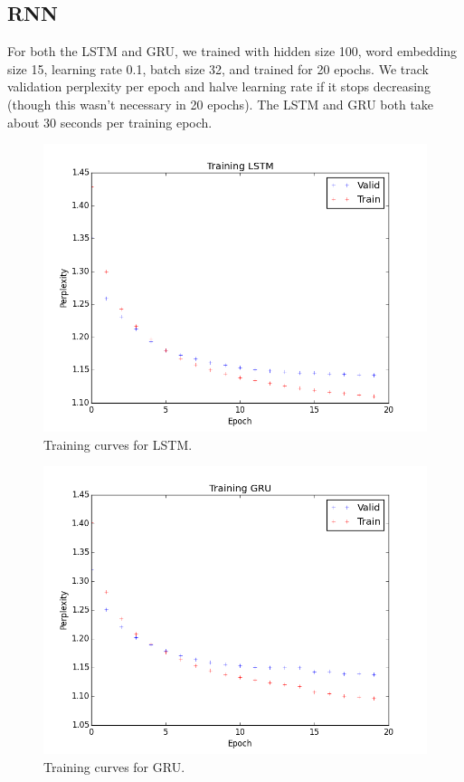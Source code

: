 \documentclass[11pt]{article}
\begin{document}
\subsection{RNN}

For both the LSTM and GRU, we trained with hidden size 100, word embedding size 15, learning rate 0.1, batch size 32, and trained for 20 epochs. We track validation perplexity per epoch and halve learning rate if it stops decreasing (though this wasn't necessary in 20 epochs). The LSTM and GRU both take about 30 seconds per training epoch.


\begin{figure}[h]
\centering
\includegraphics[scale=0.5]{train_lstm}
\caption{Training curves for LSTM.}
\end{figure}

\begin{figure}[H]
\centering
\includegraphics[scale=0.5]{train_gru}
\caption{Training curves for GRU.}
\end{figure}
\end{document}
